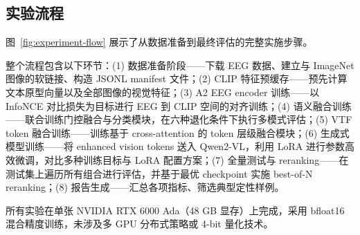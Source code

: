 \subsection{实验流程}

图~\ref{fig:experiment-flow} 展示了从数据准备到最终评估的完整实施步骤。


整个流程包含以下环节：(1) 数据准备阶段——下载 EEG 数据、建立与 ImageNet 图像的软链接、构造 JSONL manifest 文件；(2) CLIP 特征预缓存——预先计算文本原型向量以及全部图像的视觉特征；(3) A2 EEG encoder 训练——以 InfoNCE 对比损失为目标进行 EEG 到 CLIP 空间的对齐训练；(4) 语义融合训练——联合训练门控融合与分类模块，在六种退化条件下执行多模式评估；(5) VTF token 融合训练——训练基于 cross-attention 的 token 层级融合模块；(6) 生成式模型训练——将 enhanced vision tokens 送入 Qwen2-VL，利用 LoRA 进行参数高效微调，对比多种训练目标与 LoRA 配置方案；(7) 全量测试与 reranking——在测试集上遍历所有组合进行评估，并基于最优 checkpoint 实施 best-of-N reranking；(8) 报告生成——汇总各项指标、筛选典型定性样例。

所有实验在单张 NVIDIA RTX 6000 Ada（48 GB 显存）上完成，采用 bfloat16 混合精度训练，未涉及多 GPU 分布式策略或 4-bit 量化技术。
